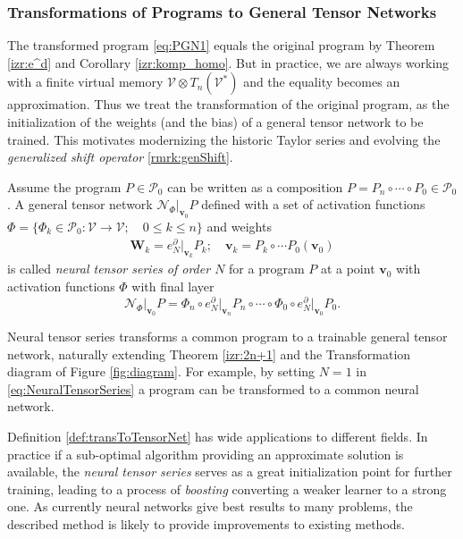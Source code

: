 \documentclass[11pt]{article}
\newcommand{\bfW}{\mathbf{W}}
\newcommand{\VV}{\mathcal{V}}
\newcommand{\vv}{\mathbf{v}}
\newcommand{\dP}{\mathcal{P}}
\newcommand{\D}{\partial}
\begin{document}
\subsubsection{Transformations of Programs to General Tensor Networks}\label{sec:transToNet}

The transformed program \eqref{eq:PGN1} equals the original program by Theorem \ref{izr:e^d} and Corollary \ref{izr:komp_homo}. But in practice, we are always working with a finite virtual memory $\VV\otimes T_n(\VV^*)$ and the equality becomes an approximation. Thus we treat the transformation of the original program, as the initialization of the weights (and the bias) of a general tensor network to be trained.  This motivates modernizing the historic Taylor series and evolving the \emph{generalized shift operator} \eqref{rmrk:genShift}.
\begin{definition}\label{def:transToTensorNet}
 Assume the program $P\in\dP_0$ can be written as a
 composition $P=P_n\circ\cdots\circ P_0\in\dP_0$. A general tensor network
 $\mathcal{N}_\Phi\vert_{\mathbf{v}_0}P$ defined with a set of activation
 functions $\Phi=\{\Phi_k\in\dP_0:\VV\to\VV;\quad 0\le k\le n\}$ and 
 weights
\begin{eqnarray*}
\bfW_k = e^\D_N\vert_{\mathbf{v}_k}P_k;\quad \vv_k=P_k\circ \cdots P_0(\vv_0)
\end{eqnarray*}
is called \emph{neural tensor series of order $N$} for a program $P$ at a point
$\vv_0$ with activation functions $\Phi$ with final layer
\begin{equation}\label{eq:NeuralTensorSeries}
\mathcal{N}_\Phi\vert_{\mathbf{v}_0}P=\Phi_n\circ e^\D_N\vert_{\mathbf{v}_n}P_n\circ\cdots\circ\Phi_0\circ e^\D_N\vert_{\mathbf{v}_0}P_0.
\end{equation}

\end{definition}


\begin{remark}
Neural tensor series transforms a common program to a trainable general tensor network, naturally extending Theorem \ref{izr:2n+1} and the Transformation diagram of Figure \ref{fig:diagram}.
For example, by setting $N=1$ in \eqref{eq:NeuralTensorSeries} a program can be transformed to a common neural network.
\end{remark}
Definition \ref{def:transToTensorNet} has wide applications to different fields.
In practice if a sub-optimal algorithm providing an approximate
solution is available, the \emph{neural tensor series} serves as a great
initialization point for further training, leading to a process of
\emph{boosting} \citep{boosting} converting a weaker learner to a strong one.
As currently neural networks give best results to many problems, the described
method is likely to provide improvements to existing methods.
\end{document}
